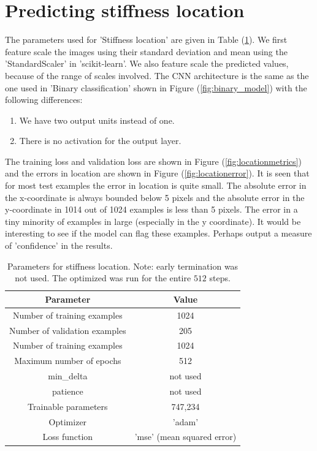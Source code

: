 \documentclass{article}
\begin{document}
\section{Predicting stiffness location}
%
The parameters used for 'Stiffness location' are given in Table (\ref{tab:stifflocparam}). We first feature scale the images using their standard deviation and mean using the 'StandardScaler' in 'scikit-learn'. We also feature scale the predicted values, because of the range of scales involved. The CNN architecture is the same as the one used in 'Binary classification' shown in Figure (\ref{fig:binary_model}) with the following differences:
\begin{enumerate}
\item{We have two output units instead of one.}
\item{There is no activation for the output layer.}
\end{enumerate}
The training loss and validation loss are shown in Figure (\ref{fig:locationmetrics}) and the errors in location are shown in Figure (\ref{fig:locationerror}). It is seen that for most test examples the error in location is quite small. The absolute error in the x-coordinate is always bounded below 5 pixels and the absolute error in the y-coordinate in 1014 out of 1024 examples is less than 5 pixels. The error in a tiny minority of examples in large (especially in the y coordinate). It would be interesting to see if the model can flag these examples. Perhaps output a measure of 'confidence' in the results.
\begin{table}
  \centering
  \begin{tabular}{|c|c|}
    \hline
    Parameter & Value \\
    \hline
    Number of training examples   & 1024 \\
    Number of validation examples & 205 \\
    Number of training examples   & 1024 \\
    Maximum number of epochs      & 512 \\
    min{\_}delta      & not used\\
    patience                      & not used  \\
    Trainable parameters          & 747,234\\
    Optimizer         & 'adam'     \\
    Loss function     & 'mse' (mean squared error) \\
    \hline
  \end{tabular}
  \caption{\label{tab:stifflocparam} Parameters for stiffness location. Note: early termination was not used. The optimized was run for the entire $512$ steps.}
\end{table}
\end{document}
